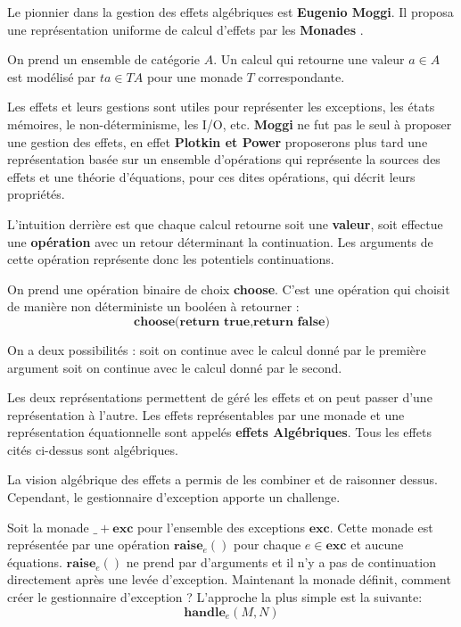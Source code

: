 	Le pionnier dans la gestion des effets algébriques est \textbf{Eugenio Moggi}. Il proposa une représentation uniforme de calcul d'effets par les \textbf{Monades} \cite{DBLP:conf/ac/BentonHM00}.
	
	\begin{exemple}
		On prend un ensemble de catégorie $A$. Un calcul qui retourne une valeur $a \in A$ est modélisé par $ta \in TA$ pour une monade $T$ correspondante.
	\end{exemple}

	Les effets et leurs gestions sont utiles pour représenter les exceptions, les états mémoires, le non-déterminisme, les I/O, etc. \textbf{Moggi} ne fut pas le seul à proposer une gestion des effets, en effet \textbf{Plotkin et Power} proposerons plus tard une représentation basée sur un ensemble d'opérations qui représente la sources des effets et une théorie d'équations, pour ces dites opérations, qui décrit leurs propriétés.
	
	L'intuition derrière est que chaque calcul retourne soit une \textbf{valeur}, soit effectue une \textbf{opération} avec un retour déterminant la continuation. Les arguments de cette opération représente donc les potentiels continuations.
	
	\begin{exemple}
		On prend une opération binaire de choix \textbf{choose}. C'est une opération qui choisit de manière non déterministe un booléen à retourner :
		\[\textbf{choose(return true,return false)}\]
		
		On a deux possibilités : soit on continue avec le calcul donné par le première argument soit on continue avec le calcul donné par le second.
	\end{exemple}

	Les deux représentations permettent de géré les effets et on peut passer d'une représentation à l'autre. Les effets représentables par une monade et une représentation équationnelle sont appelés \textbf{effets Algébriques}. Tous les effets cités ci-dessus sont algébriques.
	\medbreak
	
	La vision algébrique des effets a permis de les combiner et de raisonner dessus. Cependant, le gestionnaire d'exception apporte un challenge.
	\smallbreak
	
	Soit la monade $\_ + \textbf{exc}$ pour l'ensemble des exceptions $\textbf{exc}$. Cette monade est représentée par une opération $\textbf{raise}_e()$ pour chaque $e \in \textbf{exc}$ et aucune équations. $\textbf{raise}_e()$ ne prend par d'arguments et il n'y a pas de continuation directement après une levée d'exception. Maintenant la monade définit, comment créer le gestionnaire d'exception ? L'approche la plus simple est la suivante:
	\[\textbf{handle}_e(M,N)\]
		
